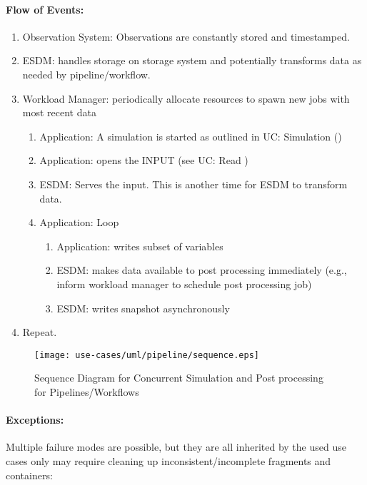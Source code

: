 \paragraph{Flow of Events:}
\begin{enumerate}
	\item Observation System: Observations are constantly stored and timestamped.
	\item ESDM: handles storage on storage system and potentially transforms data as needed by pipeline/workflow.
	\item Workload Manager: periodically allocate resources to spawn new jobs with most recent data
	\begin{enumerate}
		\item Application: A simulation is started as outlined in UC: Simulation ()
		\item Application: opens the INPUT (see UC: Read )
		\item ESDM: Serves the input. This is another time for ESDM to transform data.
		\item Application: Loop
			\begin{enumerate}
				\item Application: writes subset of variables
				\item ESDM: makes data available to post processing immediately (e.g., inform workload manager to schedule post processing job)
				\item ESDM: writes snapshot asynchronously
			\end{enumerate}
	\end{enumerate}
	\item Repeat.
\end{enumerate}

\begin{figure}
	\centering
	\texttt{[image: use-cases/uml/pipeline/sequence.eps]}
	\caption{Sequence Diagram for Concurrent Simulation and Post processing for Pipelines/Workflows}
	\label{fig:sequence pipeline}
\end{figure}




\paragraph{Exceptions:}
Multiple failure modes are possible, but they are all inherited by the used use cases only may require cleaning up inconsistent/incomplete fragments and containers:

